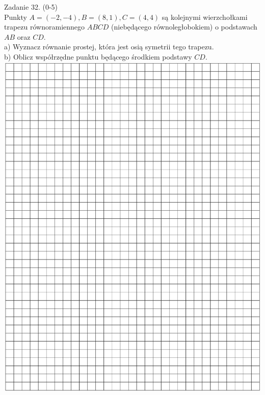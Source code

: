 \documentclass[10pt]{article}
\begin{document}
Zadanie 32. (0-5)\\
Punkty \(A=(-2,-4), B=(8,1), C=(4,4)\) są kolejnymi wierzchołkami trapezu równoramiennego \(A B C D\) (niebędącego równoległobokiem) o podstawach \(A B\) oraz \(C D\).\\
a) Wyznacz równanie prostej, która jest osią symetrii tego trapezu.\\
b) Oblicz współrzędne punktu będącego środkiem podstawy \(C D\).\\
\includegraphics[max width=\textwidth, center]{2024_11_21_4a1915d79134dda0750eg-18}
\end{document}
